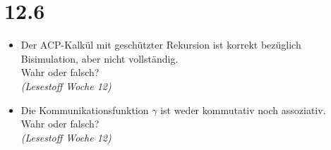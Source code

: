 \documentclass[12pt, paper=a4]{article}
\begin{document}
\section*{12.6}
	\begin{itemize}
	\item Der ACP-Kalk\"ul mit gesch\"utzter Rekursion ist korrekt bez\"uglich Bisimulation, aber nicht vollst\"andig.\\
		Wahr oder falsch?\\
		\textit{(Lesestoff Woche 12)}
	\item Die Kommunikationsfunktion $\gamma$ ist weder kommutativ noch assoziativ.\\
		Wahr oder falsch?\\
		\textit{(Lesestoff Woche 12)}
	\end{itemize}
\end{document}
